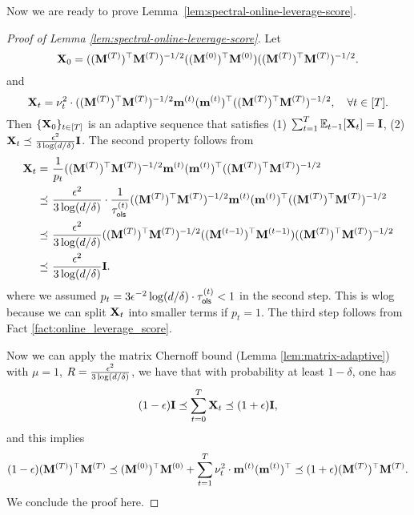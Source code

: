 Now we are ready to prove Lemma~\ref{lem:spectral-online-leverage-score}.
\begin{proof}[Proof of Lemma \ref{lem:spectral-online-leverage-score}]
Let 
\[
\mathbf{X}_{0} = ((\mathbf{M}^{(T)})^\top \mathbf{M}^{(T)})^{-1/2}((\mathbf{M}^{(0)})^\top \mathbf{M}^{(0)})((\mathbf{M}^{(T)})^\top \mathbf{M}^{(T)})^{-1/2}.
\]
and
\[
\mathbf{X}_{t} = \nu_{t}^2 \cdot ((\mathbf{M}^{(T)})^\top \mathbf{M}^{(T)})^{-1/2}\mathbf{m}^{(t)} (\mathbf{m}^{(t)})^\top ((\mathbf{M}^{(T)})^\top \mathbf{M}^{(T)})^{-1/2}, \quad \forall t\in [T].
\]
Then $\{\mathbf{X}_0\}_{t\in [T]}$ is an adaptive sequence that satisfies 
(1) $\sum_{t=1}^{T}\operatorname*{{\mathbb{E}}}_{t-1}[\mathbf{X}_t] = \mathbf{I}$, (2) $\mathbf{X}_{t} \preceq \frac{\epsilon^{2}}{3\log(d/\delta)} \mathbf{I}$.
The second property follows from 
\begin{align*}
\mathbf{X}_{t} = &~ \frac{1}{p_t} ((\mathbf{M}^{(T)})^\top \mathbf{M}^{(T)})^{-1/2}\mathbf{m}^{(t)} (\mathbf{m}^{(t)})^\top ((\mathbf{M}^{(T)})^\top \mathbf{M}^{(T)})^{-1/2}\\
\preceq &~ \frac{\epsilon^2}{3\log(d/\delta)} \cdot \frac{1}{\tau_{\mathsf{ols}}^{(t)}}  ((\mathbf{M}^{(T)})^\top \mathbf{M}^{(T)})^{-1/2}\mathbf{m}^{(t)} (\mathbf{m}^{(t)})^\top ((\mathbf{M}^{(T)})^\top \mathbf{M}^{(T)})^{-1/2}\\
\preceq &~ \frac{\epsilon^2}{3\log(d/\delta)}  ((\mathbf{M}^{(T)})^\top \mathbf{M}^{(T)})^{-1/2} ((\mathbf{M}^{(t-1)})^\top \mathbf{M}^{(t-1)}) ((\mathbf{M}^{(T)})^\top \mathbf{M}^{(T)})^{-1/2}\\
\preceq &~ \frac{\epsilon^2}{3\log(d/\delta)} \mathbf{I}.
\end{align*}
where we assumed $p_t = 3\epsilon^{-2}\log(d/\delta)\cdot\tau_{\mathsf{ols}}^{(t)} < 1$ in the second step. This is wlog because we can split $\mathbf{X}_t$ into smaller terms if $p_t = 1$. The third step follows from Fact \ref{fact:online_leverage_score}.

Now we can apply the matrix Chernoff bound (Lemma \ref{lem:matrix-adaptive}) with $\mu = 1$, $R = \frac{\epsilon^2}{3\log(d/\delta)}$, we have that with probability at least $1-\delta$, one has
\[
(1-\epsilon)\mathbf{I} \preceq \sum_{t=0}^{T}\mathbf{X}_t \preceq (1+\epsilon)\mathbf{I},
\]
and this implies
\[
(1-\epsilon)(\mathbf{M}^{(T)})^\top \mathbf{M}^{(T)} \preceq (\mathbf{M}^{(0)})^\top \mathbf{M}^{(0)} + \sum_{t=1}^{T}\nu_t^2 \cdot \mathbf{m}^{(t)} (\mathbf{m}^{(t)})^\top  \preceq (1+\epsilon)(\mathbf{M}^{(T)})^\top \mathbf{M}^{(T)}.
\]
We conclude the proof here.
\end{proof}


